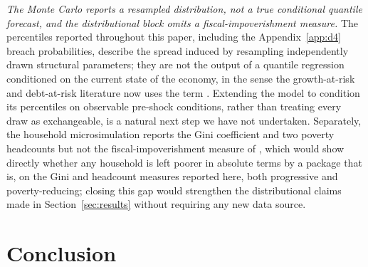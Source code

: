 \documentclass[11pt,a4paper]{article}
\begin{document}
\emph{The Monte Carlo reports a resampled distribution, not a true conditional quantile forecast, and the distributional block omits a fiscal-impoverishment measure.} The percentiles reported throughout this paper, including the Appendix~\ref{app:d4} breach probabilities, describe the spread induced by resampling independently drawn structural parameters; they are not the output of a quantile regression conditioned on the current state of the economy, in the sense the growth-at-risk and debt-at-risk literature now uses the term \citep{prasadetal2019growthatrisk,lianpresbiterowiriadinata2020,furcerietal2025debtrisk}. Extending the model to condition its percentiles on observable pre-shock conditions, rather than treating every draw as exchangeable, is a natural next step we have not undertaken. Separately, the household microsimulation reports the Gini coefficient and two poverty headcounts but not the fiscal-impoverishment measure of \citet{higginslustig2016}, which would show directly whether any household is left poorer in absolute terms by a package that is, on the Gini and headcount measures reported here, both progressive and poverty-reducing; closing this gap would strengthen the distributional claims made in Section~\ref{sec:results} without requiring any new data source.

\section{Conclusion}
\label{sec:conclusion}
\end{document}
